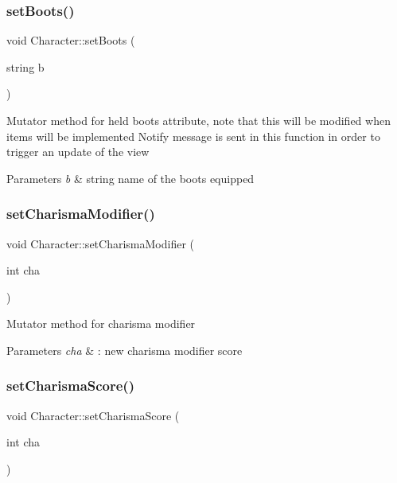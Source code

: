 \subsubsection{\texorpdfstring{set\+Boots()}{setBoots()}}
{\footnotesize\ttfamily void Character\+::set\+Boots (\begin{DoxyParamCaption}\item[{string}]{b }\end{DoxyParamCaption})}

Mutator method for held boots attribute, note that this will be modified when items will be implemented Notify message is sent in this function in order to trigger an update of the view 
\begin{DoxyParams}{Parameters}
{\em b} & string name of the boots equipped \\
\hline
\end{DoxyParams}
\hypertarget{class_character_a28ba83aeb0fae1450f69193001e433ec}{}\label{class_character_a28ba83aeb0fae1450f69193001e433ec} 
\subsubsection{\texorpdfstring{set\+Charisma\+Modifier()}{setCharismaModifier()}}
{\footnotesize\ttfamily void Character\+::set\+Charisma\+Modifier (\begin{DoxyParamCaption}\item[{int}]{cha }\end{DoxyParamCaption})}

Mutator method for charisma modifier 
\begin{DoxyParams}{Parameters}
{\em cha} & \+: new charisma modifier score \\
\hline
\end{DoxyParams}
\hypertarget{class_character_a7dff5255c010da8590f493078ab05db2}{}\label{class_character_a7dff5255c010da8590f493078ab05db2} 
\subsubsection{\texorpdfstring{set\+Charisma\+Score()}{setCharismaScore()}}
{\footnotesize\ttfamily void Character\+::set\+Charisma\+Score (\begin{DoxyParamCaption}\item[{int}]{cha }\end{DoxyParamCaption})}

